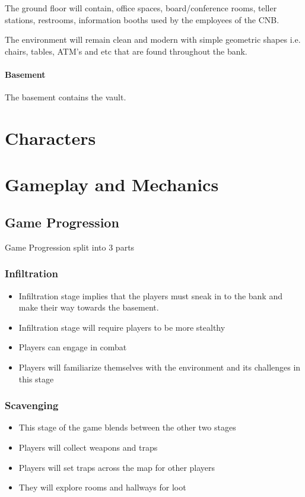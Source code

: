 \documentclass[14pt]{report}
\begin{document}
The ground floor will contain, office spaces, board/conference rooms, teller stations, restrooms, information booths used by the employees of the CNB.

The environment will remain clean and modern with simple geometric shapes i.e. chairs, tables, ATM’s and etc that are found throughout the bank.

\subsubsection{Basement}
The basement contains the vault.

\chapter{Characters}

\chapter{Gameplay and Mechanics}

\section{Game Progression}
Game Progression split into 3 parts

\subsection{Infiltration}
\begin{itemize}
    \item Infiltration stage implies that the players must sneak in to the bank and make their way towards the basement.
    \item Infiltration stage will require players to be more stealthy
    \item Players can engage in combat
    \item Players will familiarize themselves with the environment and its challenges in this stage
\end{itemize}
\subsection{Scavenging}
\begin{itemize}
    \item This stage of the game blends between the other two stages
    \item Players will collect weapons and traps
    \item Players will set traps across the map for other players
    \item They will explore rooms and hallways for loot 
\end{itemize}
\end{document}
